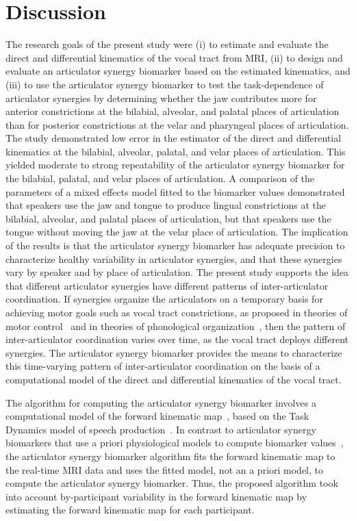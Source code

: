 \documentclass[preprint]{JASAnew}
\begin{document}
\section{Discussion}

The research goals of the present study were (i) to estimate and evaluate the direct and differential kinematics of the vocal tract from MRI, 
%
(ii) to design and evaluate an articulator synergy biomarker based on the estimated kinematics, and
%
(iii) to use the articulator synergy biomarker to test the task-dependence of articulator synergies by determining whether the jaw contributes more for anterior constrictions at the bilabial, alveolar, and palatal places of articulation than for posterior constrictions at the velar and pharyngeal places of articulation.
%
The study demonstrated low error in the estimator of the direct and differential kinematics at the bilabial, alveolar, palatal, and velar places of articulation. 
%
This yielded moderate to strong repeatability of the articulator synergy biomarker for the bilabial, palatal, and velar places of articulation.
%
A comparison of the parameters of a mixed effects model fitted to the biomarker values demonstrated that speakers use the jaw and tongue to produce lingual constrictions at the bilabial, alveolar, and palatal places of articulation, but that speakers use the tongue without moving the jaw at the velar place of articulation. 
%
The implication of the results is that the articulator synergy biomarker has adequate precision to characterize healthy variability in articulator synergies, and that these synergies vary by speaker and by place of articulation. 
%
The present study supports the idea that different articulator synergies have different patterns of inter-articulator coordination. 
If synergies organize the articulators on a temporary basis for achieving motor goals such as vocal tract constrictions, as proposed in theories of motor control~\citep{turvey1977preliminaries, saltzman1987skilled} and in theories of phonological organization~\citep{browman1986towards, browman1989articulatory}, then the pattern of inter-articulator coordination varies over time, as the vocal tract deploys different synergies. 
The articulator synergy biomarker provides the means to characterize this time-varying pattern of inter-articulator coordination on the basis of a computational model of the direct and differential kinematics of the vocal tract. 

The algorithm for computing the articulator synergy biomarker involves a computational model of the forward kinematic map~\citep{lammert2013statistical}, based on the Task Dynamics model of speech production~\citep{saltzman1989dynamical}. In contrast to articulator synergy biomarkers that use a priori physiological models to compute biomarker values~\citep[e.g., articulator synergy biomarkers of kinetic parameters from dynamic contrast-enhanced MRI,][]{aerts2008system},  the articulator synergy biomarker algorithm fits the forward kinematic map to the real-time MRI data and uses the fitted model, not an a priori model, to compute the articulator synergy biomarker. Thus, the proposed algorithm took into account by-participant variability in the forward kinematic map by estimating the forward kinematic map for each participant. 
\end{document}
